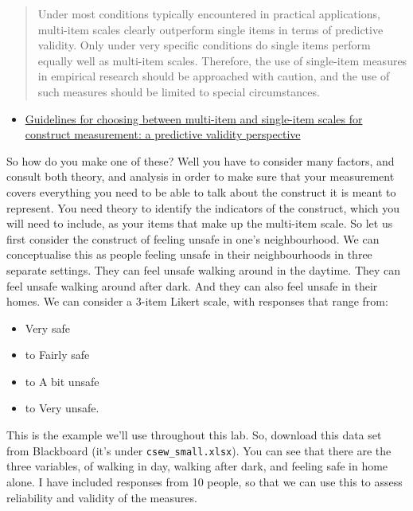 \documentclass[
]{book}
\providecommand{\tightlist}{%
  \setlength{\itemsep}{0pt}\setlength{\parskip}{0pt}}
\begin{document}
\begin{quote}
Under most conditions typically encountered in practical applications, multi-item scales clearly outperform single items in terms of predictive validity. Only under very specific conditions do single items perform equally well as multi-item scales. Therefore, the use of single-item measures in empirical research should be approached with caution, and the use of such measures should be limited to special circumstances.
\end{quote}

\begin{itemize}
\tightlist
\item
  \href{https://link.springer.com/article/10.1007/s11747-011-0300-3}{Guidelines for choosing between multi-item and single-item scales for construct measurement: a predictive validity perspective}
\end{itemize}

So how do you make one of these? Well you have to consider many factors, and consult both theory, and analysis in order to make sure that your measurement covers everything you need to be able to talk about the construct it is meant to represent. You need theory to identify the indicators of the construct, which you will need to include, as your items that make up the multi-item scale. So let us first consider the construct of feeling unsafe in one's neighbourhood. We can conceptualise this as people feeling unsafe in their neighbourhoods in three separate settings. They can feel unsafe walking around in the daytime. They can feel unsafe walking around after dark. And they can also feel unsafe in their homes. We can consider a 3-item Likert scale, with responses that range from:

\begin{itemize}
\tightlist
\item
  Very safe
\item
  to Fairly safe
\item
  to A bit unsafe
\item
  to Very unsafe.
\end{itemize}

This is the example we'll use throughout this lab. So, download this data set from Blackboard (it's under \texttt{csew\_small.xlsx}). You can see that there are the three variables, of walking in day, walking after dark, and feeling safe in home alone. I have included responses from 10 people, so that we can use this to assess reliability and validity of the measures.
\end{document}
